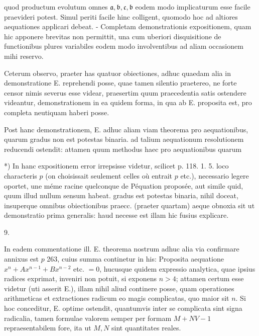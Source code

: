 \documentclass[10pt]{article}
\begin{document}
quod productum evolutum omnes \(\mathfrak{a}, \mathfrak{b}, \mathfrak{c}, \mathfrak{b}\) eodem modo implicaturum esse facile praevideri potest. Simul periti facile hinc colligent, quomodo hoc ad altiores aequationes applicari debeat. - Completam demonstrationis expositionem, quam hic apponere brevitas non permittit, una cum uberiori disquisitione de functionibus plures variabiles eodem modo involventibus ad aliam occasionem mihi reservo.

Ceterum observo, praeter has quatuor obiectiones, adhuc quaedam alia in demonstratione E. reprehendi posse, quae tamen silentio praetereo, ne forte censor nimis severus esse videar, praesertim quum praecedentia satis ostendere videantur, demonstrationem in ea quidem forma, in qua ab E. proposita est, pro completa neutiquam haberi posse.

Post hanc demonstrationem, E. adhuc aliam viam theorema pro aequationibus, quarum gradus non est potestas binaria. ad talium aequationum resolutionem reducendi ostendit: attamen quum methodus haec pro aequationibus quarum

*) In hanc expositionem error irrepsisse videtur, scilicet p. 118. 1. 5. loco characteris \(p\) (on choisissait seulement celles où entrait \(p\) etc.), necessario legere oportet, une méme racine quelconque de Péquation proposée, aut simile quid, quum illud nullum sensum habeat.
gradus est potestas binaria, nihil doceat, insuperque omnibus obiectionibus praecc. (praeter quartam) aeque obnoxia sit ut demonstratio prima generalis: haud necesse est illam hic fusius explicare.

9.

In eadem commentatione ill. E. theorema nostrum adhuc alia via confirmare annixus est \(p\) 263, cuius summa continetur in his: Proposita aequatione \(x^{n}+A x^{n-1}+B x^{n-2}\) etc. \(=0\), hucusque quidem expressio analytica, quae ipsius radices exprimat, inveniri non potuit, si exponens \(n>4\); attamen certum esse videtur (uti asserit E.), illam nihil aliud continere posse, quam operationes arithmeticas et extractiones radicum eo magis complicatas, quo maior sit \(n\). Si hoc conceditur, E. optime ostendit, quantumvis inter se complicata sint signa radicalia, tamen formulae valorem semper per formam \(M+N V-1\) repraesentabilem fore, ita ut \(M, N\) sint quantitates reales.
\end{document}
